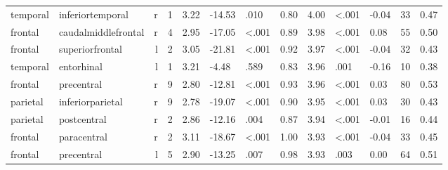 \documentclass{article}
\begin{document}
\begin{longtable}{llrR{1.3cm}R{1cm}R{1.3cm}R{1cm}R{1cm}R{1.3cm}R{1cm}R{1.8cm}R{1.3cm}R{1.8cm}}
  temporal &          inferiortemporal &    r &         1 &                  3.22 &           -14.53 &               .010 &                               0.80 &                          4.00 &                   \textless.001 &  -0.04 &     33 &      0.47 \\
   frontal &       caudalmiddlefrontal &    r &         4 &                  2.95 &           -17.05 &      \textless.001 &                               0.89 &                          3.98 &                   \textless.001 &   0.08 &     55 &      0.50 \\
   frontal &           superiorfrontal &    l &         2 &                  3.05 &           -21.81 &      \textless.001 &                               0.92 &                          3.97 &                   \textless.001 &  -0.04 &     32 &      0.43 \\
  temporal &                entorhinal &    l &         1 &                  3.21 &            -4.48 &               .589 &                               0.83 &                          3.96 &                            .001 &  -0.16 &     10 &      0.38 \\
   frontal &                precentral &    r &         9 &                  2.80 &           -12.81 &      \textless.001 &                               0.93 &                          3.96 &                   \textless.001 &   0.03 &     80 &      0.53 \\
  parietal &          inferiorparietal &    r &         9 &                  2.78 &           -19.07 &      \textless.001 &                               0.90 &                          3.95 &                   \textless.001 &   0.03 &     30 &      0.43 \\
  parietal &               postcentral &    r &         2 &                  2.86 &           -12.16 &               .004 &                               0.87 &                          3.94 &                   \textless.001 &  -0.01 &     16 &      0.44 \\
   frontal &               paracentral &    r &         2 &                  3.11 &           -18.67 &      \textless.001 &                               1.00 &                          3.93 &                   \textless.001 &  -0.04 &     33 &      0.45 \\
   frontal &                precentral &    l &         5 &                  2.90 &           -13.25 &               .007 &                               0.98 &                          3.93 &                            .003 &   0.00 &     64 &      0.51 \\

\end{longtable}
\end{document}
